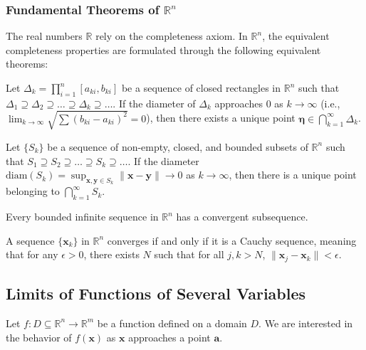 \subsubsection{Fundamental Theorems of $\mathbb{R}^n$}

The real numbers $\mathbb{R}$ rely on the completeness axiom. In $\mathbb{R}^n$, the equivalent completeness properties are formulated through the following equivalent theorems:

\begin{theorem}
Let $\Delta_k = \prod_{i=1}^n [a_{ki}, b_{ki}]$ be a sequence of closed rectangles in $\mathbb{R}^n$ such that $\Delta_1 \supseteq \Delta_2 \supseteq \dots \supseteq \Delta_k \supseteq \dots$. If the diameter of $\Delta_k$ approaches $0$ as $k \to \infty$ (i.e., $\lim_{k \to \infty} \sqrt{\sum (b_{ki} - a_{ki})^2} = 0$), then there exists a unique point $\mathbf{\eta} \in \bigcap_{k=1}^{\infty} \Delta_k$.
\end{theorem}

\begin{theorem}
Let $\{S_k\}$ be a sequence of non-empty, closed, and bounded subsets of $\mathbb{R}^n$ such that $S_1 \supseteq S_2 \supseteq \dots \supseteq S_k \supseteq \dots$. If the diameter $\text{diam}(S_k) = \sup_{\mathbf{x}, \mathbf{y} \in S_k} \|\mathbf{x} - \mathbf{y}\| \to 0$ as $k \to \infty$, then there is a unique point belonging to $\bigcap_{k=1}^{\infty} S_k$.
\end{theorem}

\begin{theorem}
Every bounded infinite sequence in $\mathbb{R}^n$ has a convergent subsequence.
\end{theorem}

\begin{theorem}
A sequence $\{\mathbf{x}_k\}$ in $\mathbb{R}^n$ converges if and only if it is a Cauchy sequence, meaning that for any $\epsilon > 0$, there exists $N$ such that for all $j, k > N$, $\|\mathbf{x}_j - \mathbf{x}_k\| < \epsilon$.
\end{theorem}

\subsection{Limits of Functions of Several Variables}

Let $f: D \subseteq \mathbb{R}^n \to \mathbb{R}^m$ be a function defined on a domain $D$. We are interested in the behavior of $f(\mathbf{x})$ as $\mathbf{x}$ approaches a point $\mathbf{a}$.

